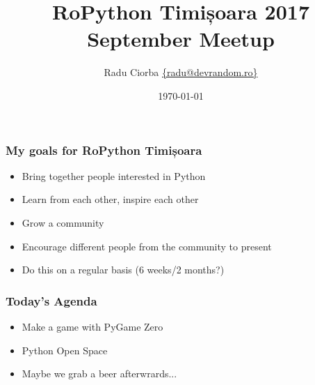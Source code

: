 \documentclass{beamer}
\title[PyTim 09/2017]{RoPython Timișoara 2017 September Meetup} %
\author{Radu Ciorba \href{mailto:radu@devrandom.ro}{\{radu@devrandom.ro\}}} %
\date{\today} %
\begin{document}
\begin{frame}
  \titlepage %
\end{frame}

\begin{frame}
  \frametitle{My goals for RoPython Timișoara}
  \begin{itemize}
  \item Bring together people interested in Python
  \item Learn from each other, inspire each other
  \item Grow a community
  \item Encourage different people from the community to present
  \item Do this on a regular basis (6 weeks/2 months?)
  \end{itemize}
\end{frame}


\begin{frame}
  \frametitle{Today's Agenda}
  \begin{itemize}
  \item Make a game with PyGame Zero
  \item Python Open Space
  \item Maybe we grab a beer afterwrards...
  \end{itemize}
\end{frame}
\end{document}
